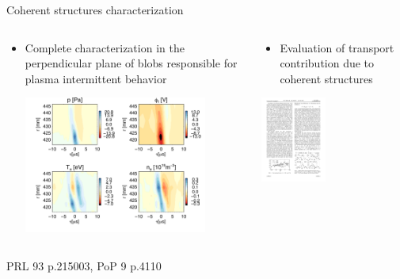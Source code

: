 \documentclass[t,10pt]{beamer}
\begin{document}
\begin{frame}{Coherent structures characterization}


\begin{columns}[t]
\begin{column}{0.47\textwidth}
\begin{itemize}
\item Complete characterization in the perpendicular plane of blobs
  responsible for plasma intermittent behavior
\begin{center}
\includegraphics[height=4.5cm]{2Dstructure}
\end{center}
\end{itemize}
\end{column}
\pause
\begin{column}{0.5\textwidth}
\begin{itemize}
\item Evaluation of transport contribution due to coherent structures
\end{itemize}
\begin{center}
\includegraphics[height=2.8cm]{structure-diffusivity}
\end{center}
\end{column}
\end{columns}
\begin{center}
{\tiny PRL 93 p.215003, PoP 9 p.4110}
\end{center}
\end{frame}
\end{document}
